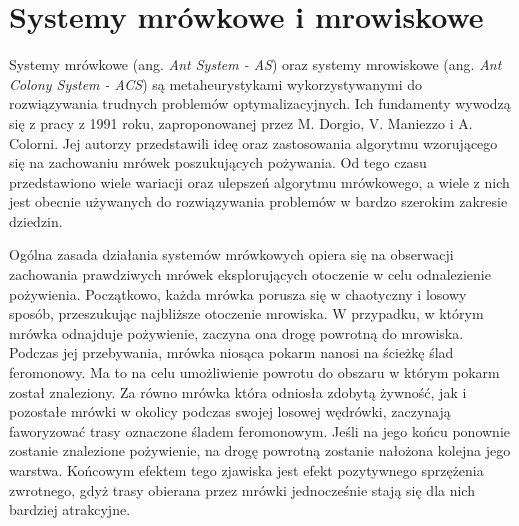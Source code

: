 \chapter{Systemy mrówkowe i mrowiskowe}\label{chap:antsys}
{

    Systemy mrówkowe (ang. \textit{Ant System - AS}) oraz systemy mrowiskowe (ang. \textit{Ant Colony System - ACS}) są
    metaheurystykami wykorzystywanymi do rozwiązywania trudnych problemów optymalizacyjnych. Ich fundamenty wywodzą się
    z pracy z 1991 roku, zaproponowanej przez M. Dorgio, V. Maniezzo i A. Colorni\cite{Dorigo1991AntSA}. Jej autorzy
    przedstawili ideę oraz zastosowania algorytmu wzorującego się na zachowaniu mrówek poszukujących pożywania. Od tego
    czasu przedstawiono wiele wariacji oraz ulepszeń algorytmu mrówkowego, a wiele z nich jest obecnie używanych do
    rozwiązywania problemów w bardzo szerokim zakresie dziedzin.

    Ogólna zasada działania systemów mrówkowych opiera się na obserwacji zachowania prawdziwych mrówek eksplorujących
    otoczenie w celu odnalezienie pożywienia. Początkowo, każda mrówka porusza się w chaotyczny i losowy sposób,
    przeszukując najbliższe otoczenie mrowiska. W przypadku, w którym mrówka odnajduje pożywienie, zaczyna ona drogę
    powrotną do mrowiska. Podczas jej przebywania, mrówka niosąca pokarm nanosi na ścieżkę ślad feromonowy. Ma to na
    celu umożliwienie powrotu do obszaru w którym pokarm został znaleziony. Za równo mrówka która odniosła zdobytą
    żywność, jak i pozostałe mrówki w okolicy podczas swojej losowej wędrówki, zaczynają faworyzować trasy oznaczone
    śladem feromonowym. Jeśli na jego końcu ponownie zostanie znalezione pożywienie, na drogę powrotną zostanie nałożona
    kolejna jego warstwa. Końcowym efektem tego zjawiska jest efekt pozytywnego sprzężenia zwrotnego, gdyż trasy
    obierana przez mrówki jednocześnie stają się dla nich bardziej atrakcyjne.

}
